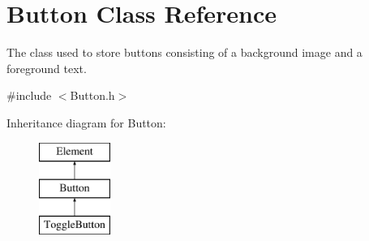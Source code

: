 \hypertarget{class_button}{\section{Button Class Reference}
\label{class_button}
}


The class used to store buttons consisting of a background image and a foreground text.  




{\ttfamily \#include $<$Button.\-h$>$}

Inheritance diagram for Button\-:\begin{figure}[H]
\begin{center}
\leavevmode
\includegraphics[height=3.000000cm]{class_button}
\end{center}
\end{figure}
